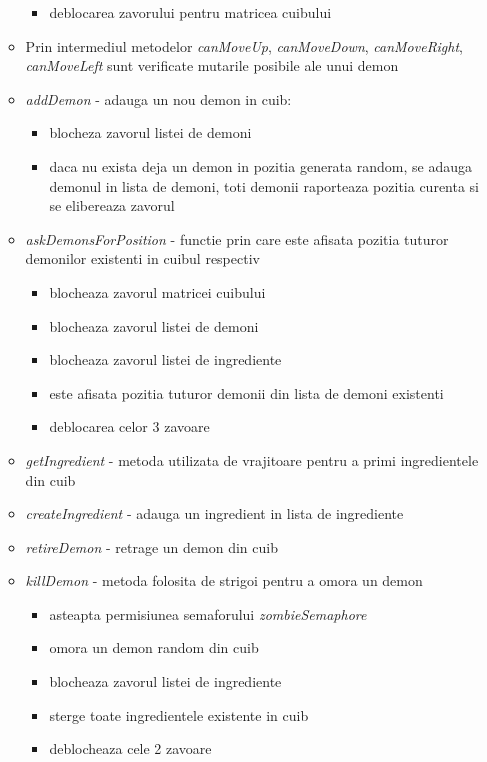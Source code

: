 \documentclass{article}
\begin{document}
\begin{itemize}
\begin{itemize}
\begin{itemize}
                        \item deblocarea zavorului pentru matricea cuibului
                    \end{itemize}
                \item Prin intermediul metodelor \textit{canMoveUp}, \textit{canMoveDown}, \textit{canMoveRight}, \textit{canMoveLeft} sunt verificate mutarile posibile ale unui demon
                \item \textit{addDemon} - adauga un nou demon in cuib:
                    \begin{itemize}
                        \item blocheza zavorul listei de demoni
                        \item daca nu exista deja un demon in pozitia generata random, se adauga demonul in lista de demoni, toti demonii raporteaza pozitia curenta si se elibereaza zavorul
                        
                    \end{itemize}
                \item \textit{askDemonsForPosition} - functie prin care este afisata pozitia tuturor demonilor existenti in cuibul respectiv
                    \begin{itemize}
                        \item blocheaza zavorul matricei cuibului
                        \item blocheaza zavorul listei de demoni
                        \item blocheaza zavorul listei de ingrediente
                        \item este afisata pozitia tuturor demonii din lista de demoni existenti 
                        \item deblocarea celor 3 zavoare
                   \end{itemize}
                \item \textit{getIngredient} - metoda utilizata de vrajitoare pentru a primi ingredientele din cuib
                \item \textit{createIngredient} - adauga un ingredient in lista de ingrediente
                \item \textit{retireDemon} - retrage un demon din cuib
                \item \textit{killDemon} - metoda folosita de strigoi pentru a omora un demon
                \begin{itemize}
                    \item asteapta permisiunea semaforului \textit{zombieSemaphore}
                    \item omora un demon random din cuib
                    \item blocheaza zavorul listei de ingrediente
                    \item sterge toate ingredientele existente in cuib
                    \item deblocheaza cele 2 zavoare
                

\end{itemize}
\end{itemize}
\end{itemize}
\end{document}
